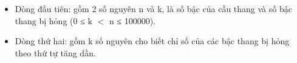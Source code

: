 \begin{itemize}
	\item Dòng đầu tiên: gồm 2 số nguyên n và k, là số bậc của cầu thang và số bậc thang bị hỏng (0 ≤ k $<$ n ≤ 100000).
	\item Dòng thứ hai: gồm k số nguyên cho biết chỉ số của các bậc thang bị hỏng theo thứ tự tăng dần.
\end{itemize}